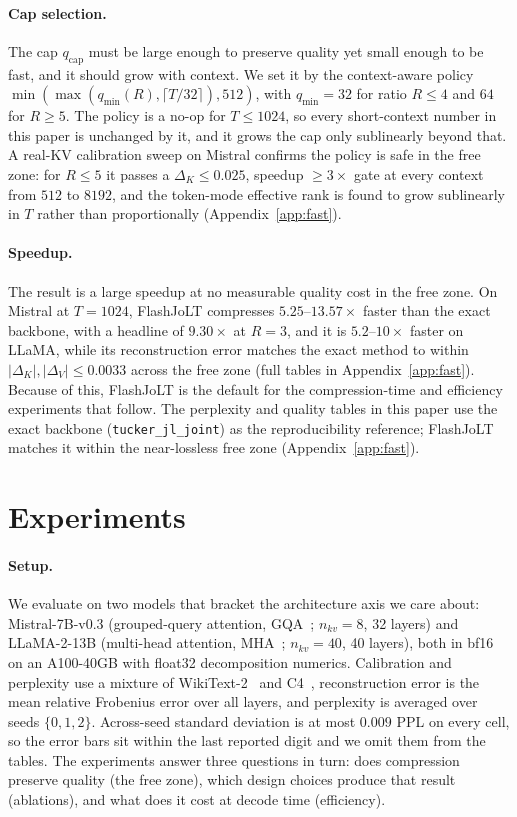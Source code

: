 \documentclass{article}
\begin{document}
\paragraph{Cap selection.} The cap $q_{\mathrm{cap}}$ must be large enough to preserve quality yet small enough to be fast, and it should grow with context. We set it by the context-aware policy $\min(\max(q_{\min}(R), \lceil T/32 \rceil), 512)$, with $q_{\min}{=}32$ for ratio $R \le 4$ and $64$ for $R \ge 5$. The policy is a no-op for $T \le 1024$, so every short-context number in this paper is unchanged by it, and it grows the cap only sublinearly beyond that. A real-KV calibration sweep on Mistral confirms the policy is safe in the free zone: for $R \le 5$ it passes a $\Delta_K \le 0.025$, speedup $\ge 3\times$ gate at every context from $512$ to $8192$, and the token-mode effective rank is found to grow sublinearly in $T$ rather than proportionally (Appendix~\ref{app:fast}).

\paragraph{Speedup.} The result is a large speedup at no measurable quality cost in the free zone. On Mistral at $T{=}1024$, FlashJoLT compresses $5.25$--$13.57\times$ faster than the exact backbone, with a headline of $9.30\times$ at $R{=}3$, and it is $5.2$--$10\times$ faster on LLaMA, while its reconstruction error matches the exact method to within $|\Delta_K|, |\Delta_V| \le 0.0033$ across the free zone (full tables in Appendix~\ref{app:fast}). Because of this, FlashJoLT is the default for the compression-time and efficiency experiments that follow. The perplexity and quality tables in this paper use the exact backbone (\texttt{tucker\_jl\_joint}) as the reproducibility reference; FlashJoLT matches it within the near-lossless free zone (Appendix~\ref{app:fast}).

\section{Experiments}
\label{sec:results}
\paragraph{Setup.} We evaluate on two models that bracket the architecture axis we care about: Mistral-7B-v0.3 (grouped-query attention, GQA~\citep{ainslie2023gqa}; $n_{kv}{=}8$, 32 layers) and LLaMA-2-13B (multi-head attention, MHA~\citep{vaswani2017attention}; $n_{kv}{=}40$, 40 layers), both in bf16 on an A100-40GB with float32 decomposition numerics. Calibration and perplexity use a mixture of WikiText-2~\citep{merity2017wikitext} and C4~\citep{raffel2020c4}, reconstruction error is the mean relative Frobenius error over all layers, and perplexity is averaged over seeds $\{0,1,2\}$. Across-seed standard deviation is at most $0.009$ PPL on every cell, so the error bars sit within the last reported digit and we omit them from the tables. The experiments answer three questions in turn: does compression preserve quality (the free zone), which design choices produce that result (ablations), and what does it cost at decode time (efficiency).
\end{document}
